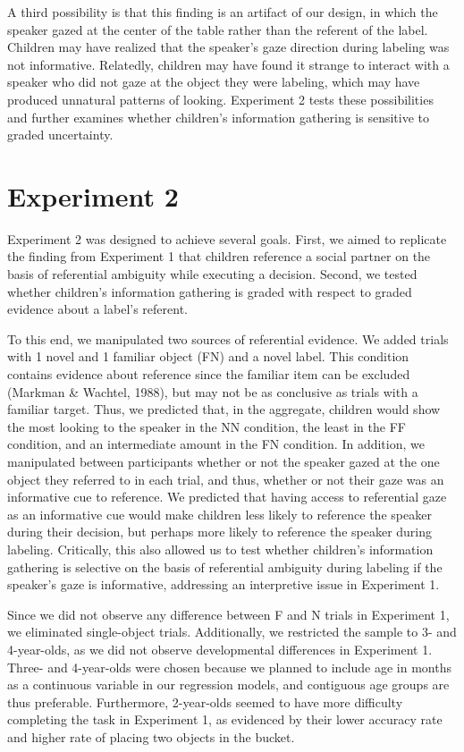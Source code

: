 \documentclass[english,,man]{apa6}
\begin{document}
A third possibility is that this finding is an artifact of our design,
in which the speaker gazed at the center of the table rather than the
referent of the label. Children may have realized that the speaker's
gaze direction during labeling was not informative. Relatedly, children
may have found it strange to interact with a speaker who did not gaze at
the object they were labeling, which may have produced unnatural
patterns of looking. Experiment 2 tests these possibilities and further
examines whether children's information gathering is sensitive to graded
uncertainty.

\section{Experiment 2}\label{experiment-2}

Experiment 2 was designed to achieve several goals. First, we aimed to
replicate the finding from Experiment 1 that children reference a social
partner on the basis of referential ambiguity while executing a
decision. Second, we tested whether children's information gathering is
graded with respect to graded evidence about a label's referent.

To this end, we manipulated two sources of referential evidence. We
added trials with 1 novel and 1 familiar object (FN) and a novel label.
This condition contains evidence about reference since the familiar item
can be excluded (Markman \& Wachtel, 1988), but may not be as conclusive
as trials with a familiar target. Thus, we predicted that, in the
aggregate, children would show the most looking to the speaker in the NN
condition, the least in the FF condition, and an intermediate amount in
the FN condition. In addition, we manipulated between participants
whether or not the speaker gazed at the one object they referred to in
each trial, and thus, whether or not their gaze was an informative cue
to reference. We predicted that having access to referential gaze as an
informative cue would make children less likely to reference the speaker
during their decision, but perhaps more likely to reference the speaker
during labeling. Critically, this also allowed us to test whether
children's information gathering is selective on the basis of
referential ambiguity during labeling if the speaker's gaze is
informative, addressing an interpretive issue in Experiment 1.

Since we did not observe any difference between F and N trials in
Experiment 1, we eliminated single-object trials. Additionally, we
restricted the sample to 3- and 4-year-olds, as we did not observe
developmental differences in Experiment 1. Three- and 4-year-olds were
chosen because we planned to include age in months as a continuous
variable in our regression models, and contiguous age groups are thus
preferable. Furthermore, 2-year-olds seemed to have more difficulty
completing the task in Experiment 1, as evidenced by their lower
accuracy rate and higher rate of placing two objects in the bucket.
\end{document}
